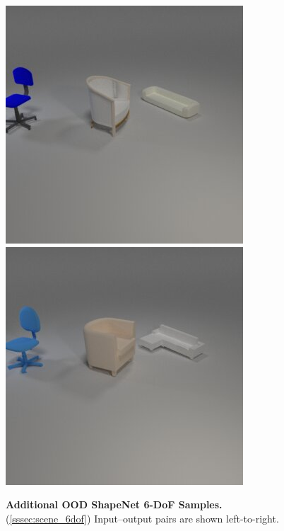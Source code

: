 \begin{figure}
\includegraphics[width=0.2475\linewidth]{figures/shapenet/OOD/5_in.jpg}\hfill
\includegraphics[width=0.2475\linewidth]{figures/shapenet/OOD/5_out.jpg}
\caption{\textbf{Additional OOD ShapeNet 6-DoF Samples.} (\cref{sssec:scene_6dof}) Input--output pairs are shown left-to-right.}
\label{fig:scene_6dof_ood_samples_additional}
\end{figure}
